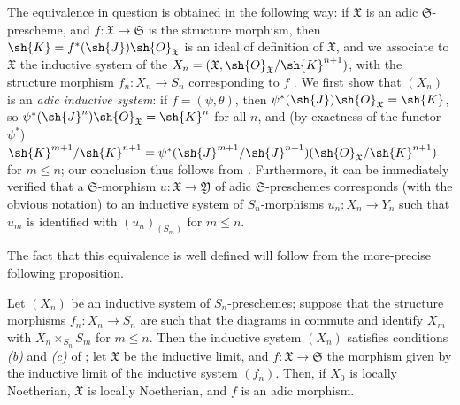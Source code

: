 The equivalence in question is obtained in the following way:
if $\mathfrak{X}$ is an adic $\mathfrak{S}$-prescheme, and $f:\mathfrak{X}\to\mathfrak{S}$ is the structure morphism, then $\sh{K}=f^*(\sh{J})\sh{O}_\mathfrak{X}$ is an ideal of definition of $\mathfrak{X}$, and we associate to $\mathfrak{X}$ the inductive system of the $X_n=(\mathfrak{X},\sh{O}_\mathfrak{X}/\sh{K}^{n+1})$, with the structure morphism $f_n:X_n\to S_n$ corresponding to $f$ .
We first show that $(X_n)$ is an \emph{adic inductive system}:
if $f=(\psi,\theta)$, then $\psi^*(\sh{J})\sh{O}_\mathfrak{X}=\sh{K}$, so $\psi^*(\sh{J}^n)\sh{O}_\mathfrak{X}=\sh{K}^n$ for all $n$, and (by exactness of the functor $\psi^*$) $\sh{K}^{m+1}/\sh{K}^{n+1}=\psi^*(\sh{J}^{m+1}/\sh{J}^{n+1})(\sh{O}_\mathfrak{X}/\sh{K}^{n+1})$ for $m\leq n$;
our conclusion thus follows from .
Furthermore, it can be immediately verified that a $\mathfrak{S}$-morphism $u:\mathfrak{X}\to\mathfrak{Y}$ of adic $\mathfrak{S}$-preschemes corresponds (with the obvious notation)
to an inductive system of $S_n$-morphisms $u_n:X_n\to Y_n$ such that $u_m$ is identified with $(u_n)_{(S_m)}$ for $m\leq n$.

The fact that this equivalence is well defined will follow from the more-precise following proposition.

\begin{proposition}[10.12.3.1]
\label{I.10.12.3.1}
Let $(X_n)$ be an inductive system of $S_n$-preschemes;
suppose that the structure morphisms $f_n:X_n\to S_n$ are such that the diagrams in  commute and identify $X_m$ with $X_n\times_{S_n}S_m$ for $m\leq n$.
Then the inductive system $(X_n)$ satisfies conditions \emph{(b)} and \emph{(c)} of ;
let $\mathfrak{X}$ be the inductive limit, and $f:\mathfrak{X}\to\mathfrak{S}$ the morphism given by the inductive limit of the inductive system $(f_n)$.
Then, if $X_0$ is locally Noetherian, $\mathfrak{X}$ is locally Noetherian, and $f$ is an adic morphism.
\end{proposition}

